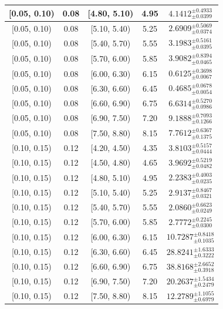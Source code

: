 \begin{longtable}{|c|c|c|c|c|}
\hline
[0.05, 0.10) & 0.08 & [4.80, 5.10) & 4.95 & $4.1412^{ \pm 0.4933 }_{ \pm 0.0399 }$ \\ 
\hline
[0.05, 0.10) & 0.08 & [5.10, 5.40) & 5.25 & $2.6909^{ \pm 0.5069 }_{ \pm 0.0374 }$ \\ 
\hline
[0.05, 0.10) & 0.08 & [5.40, 5.70) & 5.55 & $3.1983^{ \pm 0.5161 }_{ \pm 0.0395 }$ \\ 
\hline
[0.05, 0.10) & 0.08 & [5.70, 6.00) & 5.85 & $3.9082^{ \pm 0.8394 }_{ \pm 0.0465 }$ \\ 
\hline
[0.05, 0.10) & 0.08 & [6.00, 6.30) & 6.15 & $0.6125^{ \pm 0.3698 }_{ \pm 0.0067 }$ \\ 
\hline
[0.05, 0.10) & 0.08 & [6.30, 6.60) & 6.45 & $0.4685^{ \pm 0.0678 }_{ \pm 0.0054 }$ \\ 
\hline
[0.05, 0.10) & 0.08 & [6.60, 6.90) & 6.75 & $6.6314^{ \pm 0.5270 }_{ \pm 0.0986 }$ \\ 
\hline
[0.05, 0.10) & 0.08 & [6.90, 7.50) & 7.20 & $9.1888^{ \pm 0.7093 }_{ \pm 0.1266 }$ \\ 
\hline
[0.05, 0.10) & 0.08 & [7.50, 8.80) & 8.15 & $7.7612^{ \pm 0.6367 }_{ \pm 0.1375 }$ \\ 
\hline
[0.10, 0.15) & 0.12 & [4.20, 4.50) & 4.35 & $3.8103^{ \pm 0.5157 }_{ \pm 0.0444 }$ \\ 
\hline
[0.10, 0.15) & 0.12 & [4.50, 4.80) & 4.65 & $3.9692^{ \pm 0.5219 }_{ \pm 0.0482 }$ \\ 
\hline
[0.10, 0.15) & 0.12 & [4.80, 5.10) & 4.95 & $2.2383^{ \pm 0.4003 }_{ \pm 0.0235 }$ \\ 
\hline
[0.10, 0.15) & 0.12 & [5.10, 5.40) & 5.25 & $2.9137^{ \pm 0.8467 }_{ \pm 0.0321 }$ \\ 
\hline
[0.10, 0.15) & 0.12 & [5.40, 5.70) & 5.55 & $2.0860^{ \pm 0.6623 }_{ \pm 0.0249 }$ \\ 
\hline
[0.10, 0.15) & 0.12 & [5.70, 6.00) & 5.85 & $2.7772^{ \pm 0.2245 }_{ \pm 0.0300 }$ \\ 
\hline
[0.10, 0.15) & 0.12 & [6.00, 6.30) & 6.15 & $10.7287^{ \pm 0.8418 }_{ \pm 0.1035 }$ \\ 
\hline
[0.10, 0.15) & 0.12 & [6.30, 6.60) & 6.45 & $28.8241^{ \pm 1.6333 }_{ \pm 0.3222 }$ \\ 
\hline
[0.10, 0.15) & 0.12 & [6.60, 6.90) & 6.75 & $38.8168^{ \pm 2.6652 }_{ \pm 0.3918 }$ \\ 
\hline
[0.10, 0.15) & 0.12 & [6.90, 7.50) & 7.20 & $20.2637^{ \pm 1.5434 }_{ \pm 0.2479 }$ \\ 
\hline
[0.10, 0.15) & 0.12 & [7.50, 8.80) & 8.15 & $12.2789^{ \pm 1.1055 }_{ \pm 0.6979 }$ \\ 

\end{longtable}
